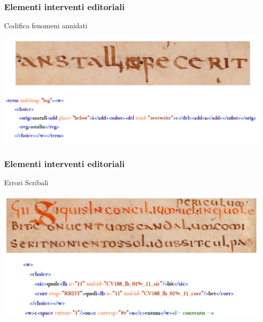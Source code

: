 \begin{frame}
    \frametitle{Elementi interventi editoriali}
    \addtocounter{nframe}{1}
    
   
    \begin{block}{Codifica fenomeni annidati}
        \begin{center}
            \includegraphics[width=.95\textwidth]{imgs/Aggiunta-cancellatura-regolarizzazione.png}
        \end{center}

    \end{block}
    
\end{frame}

\begin{frame}
    \frametitle{Elementi interventi editoriali}
    \addtocounter{nframe}{1}
    
   
    \begin{block}{Errori Scribali}
        \begin{center}
            \includegraphics[width=.95\textwidth]{imgs/Correzioni.png}
        \end{center}

    \end{block}
    
\end{frame}

